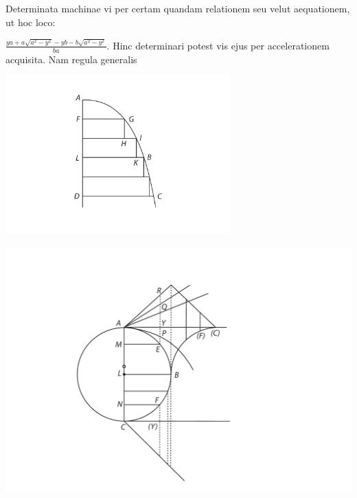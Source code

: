 \vspace*{8mm}
\pstart 
\normalsize
\noindent
[4~r\textsuperscript{o}] Determinata machinae vi\protect{} per certam quandam relationem seu velut aequationem, ut hoc loco: \rule[-4mm]{0pt}{10mm}$\displaystyle\frac{ya + a \sqrt{a^2-y^2} - yb - b\sqrt{a^2-y^2}}{ba}$. 
\pend
\pstart
Hinc determinari potest vis\protect{} ejus per accelerationem\protect{} acquisita. Nam regula generalis 
\pend
\vspace{1em}
\begin{minipage}[t]{0.5\textwidth}
\includegraphics[width=0.65\textwidth]{images/lh0351009_004r-d1.pdf}
\end{minipage}
\begin{minipage}[t]{0.5\textwidth}
\includegraphics[width=1.0\textwidth]{images/lh0351009_004r-d2.pdf}
\end{minipage}
